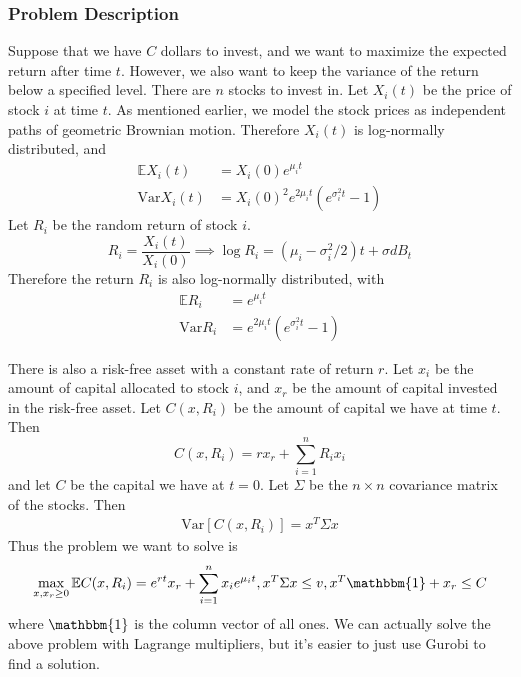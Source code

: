 \documentclass{amsart}
\theoremstyle{definition}
\theoremstyle{remark}
\begin{document}
\subsubsection{Problem Description}
Suppose that we have $C$ dollars to invest, and we want to maximize the expected return after time $t$. However, we also want to keep the variance of the return below a specified level. There are $n$ stocks to invest in. Let $X_i(t)$ be the price of stock $i$ at time $t$. As mentioned earlier, we model the stock prices as independent paths of geometric Brownian motion. Therefore $X_i(t)$ is log-normally distributed, and
\begin{align*}
\mathbb{E} X_i(t) &= X_i(0)e^{\mu_i t}\\
\text{Var} X_i(t) &= X_i(0)^2e^{2\mu_i t}\left(e^{\sigma_i^2 t} -1\right)
\end{align*}
Let $R_i$ be the random return of stock $i$.
\begin{equation*}
R_i = \frac{X_i(t)}{X_i(0)} \implies \log R_i = (\mu_i - \sigma_i^2 / 2) t + \sigma dB_t
\end{equation*}
Therefore the return $R_i$ is also log-normally distributed, with
\begin{align*}
\mathbb{E}R_i &= e^{\mu_i t}\\
\text{Var}R_i &= e^{2\mu_i t}\left(e^{\sigma_i^2 t} -1\right)
\end{align*}

There is also a risk-free asset with a constant rate of return $r$. Let $x_i$ be the amount of capital allocated to stock $i$, and $x_r$ be the amount of capital invested in the risk-free asset. Let $C(x, R_i)$ be the amount of capital we have at time $t$. Then
\begin{equation*}
C(x, R_i) = r x_r + \sum_{i=1}^n R_i x_i 
\end{equation*}
and let $C$ be the capital we have at $t=0$.
Let $\Sigma$ be the $n\times n$ covariance matrix of the stocks. Then
\begin{align*}
\text{Var}[ C(x,R_i)] = x^T \Sigma x
\end{align*}
Thus the problem we want to solve is
\begin{equation}\label{eq:markowitz}
\max_{x,x_r\ge 0} \mathbb{E}C(x, R_i) = e^{rt} x_r + \sum_{i=1}^n x_i e^{\mu_i t}, x^T \Sigma x \le v, x^T \mathbbm{1} + x_r \le C
\end{equation}
where $\mathbbm{1}$ is the column vector of all ones. We can actually solve the above problem with Lagrange multipliers, but it's easier to just use Gurobi to find a solution.
\end{document}
